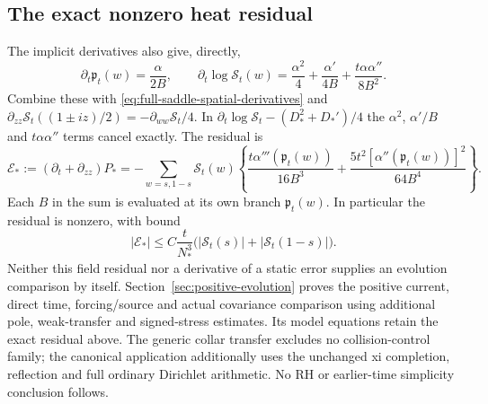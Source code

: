 \subsection{The exact nonzero heat residual}
The implicit derivatives also give, directly,
\begin{equation}
 \partial_t\mathfrak p_t(w)=\frac\alpha{2B},\qquad
 \partial_t\log\mathcal S_t(w)
 =\frac{\alpha^2}4+\frac{\alpha'}{4B}
                         +\frac{t\alpha\alpha''}{8B^2}.
 \label{eq:full-saddle-time-derivatives}
\end{equation}
Combine these with \eqref{eq:full-saddle-spatial-derivatives} and
$\partial_{zz}\mathcal S_t((1\pm iz)/2)
=-\partial_{ww}\mathcal S_t/4$.
In $\partial_t\log\mathcal S_t-(D_*^2+D_*')/4$ the
$\alpha^2$, $\alpha'/B$ and $t\alpha\alpha''$ terms cancel exactly.
The residual is
\begin{equation}
 \boxed{\mathcal E_*:=(\partial_t+\partial_{zz})P_*
 =-\sum_{w=s,1-s}\mathcal S_t(w)
 \left\{\frac{t\alpha'''(\mathfrak p_t(w))}{16B^3}
  +\frac{5t^2[\alpha''(\mathfrak p_t(w))]^2}{64B^4}\right\}.}
 \label{eq:full-saddle-residual}
\end{equation}
Each $B$ in the sum is evaluated at its own branch
$\mathfrak p_t(w)$. In particular the residual is nonzero, with bound
\begin{equation}
 |\mathcal E_*|\le C\frac{t}{N_*^3}
       \bigl(|\mathcal S_t(s)|+|\mathcal S_t(1-s)|\bigr).
 \label{eq:full-saddle-residual-bound}
\end{equation}
Neither this field residual nor a derivative of a static error supplies
an evolution comparison by itself. Section~\ref{sec:positive-evolution}
proves the positive current, direct time, forcing/source and actual
covariance comparison using additional pole, weak-transfer and signed-stress
estimates. Its model equations retain the exact residual above.
The generic collar transfer excludes no collision-control family;
the canonical application additionally uses the unchanged xi completion,
reflection and full ordinary Dirichlet arithmetic. No RH or earlier-time
simplicity conclusion follows.
